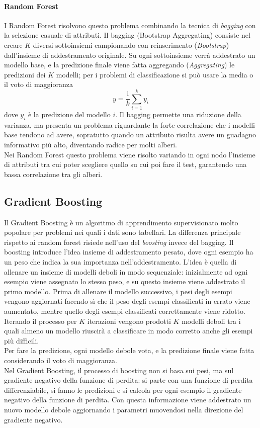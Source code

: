 \paragraph{Random Forest}
I Random Forest \cite{breiman2001random} risolvono questo problema  combinando la tecnica di \textit{bagging} con la selezione casuale di attributi.
Il bagging (Bootstrap Aggregating) consiste nel creare $K$ diversi sottoinsiemi campionando con reinserimento (\textit{Bootstrap}) dall'insieme di addestramento originale. Su ogni sottoinsieme verrà addestrato un modello base, e la predizione finale viene fatta aggregando (\textit{Aggregating}) le predizioni dei $K$ modelli; per i problemi di classificazione si può usare la media o il voto di maggioranza
\begin{equation}
    y = \frac{1}{k}\sum_{i=1}^{k} y_i
\end{equation}
dove $y_i$ è la predizione del modello $i$. Il bagging permette una riduzione della varianza, ma presenta un problema riguardante la forte correlazione che i modelli base tendono ad avere, sopratutto quando un attributo risulta avere un guadagno informativo più alto, diventando radice per molti alberi.\\
Nei Random Forest questo problema viene risolto variando in ogni nodo l'insieme di attributi tra cui poter scegliere quello su cui poi fare il test, garantendo una bassa correlazione tra gli alberi.
\subsection{Gradient Boosting}
Il Gradient Boosting è un algoritmo di apprendimento supervisionato molto popolare per problemi nei quali i dati sono tabellari. La differenza principale rispetto ai random forest risiede nell'uso del \textit{boosting} invece del bagging.
Il boosting introduce l'idea insieme di addestramento pesato, dove ogni esempio ha un peso che indica la sua importanza nell'addestramento. L'idea è quella di allenare un insieme di modelli deboli in modo sequenziale: inizialmente ad ogni esempio viene assegnato lo stesso peso, e su questo insieme viene addestrato il primo modello. Prima di allenare il modello successivo, i pesi degli esempi vengono aggiornati facendo sì che il peso degli esempi classificati in  errato viene aumentato, mentre quello degli esempi classificati correttamente viene ridotto. Iterando il processo per $K$ iterazioni vengono prodotti $K$ modelli deboli tra i quali almeno un modello riuscirà a classificare in modo corretto anche gli esempi più difficili.\\
Per fare la predizione, ogni modello debole vota, e la predizione finale viene fatta considerando il voto di maggioranza.\\
Nel Gradient Boosting, il processo di boosting non si basa sui pesi, ma sul gradiente negativo della funzione di perdita: si parte con una funzione di perdita differenziabile, si fanno le predizioni e si calcola per ogni esempio il gradiente negativo della funzione di perdita. Con questa informazione viene addestrato un nuovo modello debole aggiornando i parametri muovendosi nella direzione del gradiente negativo. 
